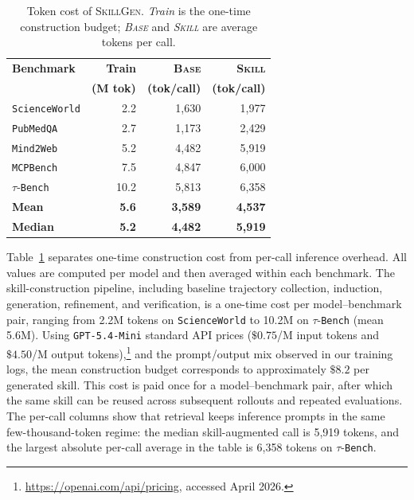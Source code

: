 \documentclass{article}
\begin{document}
\begin{table}[h]
\centering
\caption{Token cost of \textsc{SkillGen}. \emph{Train} is the one-time construction budget; \emph{\textsc{Base}} and \emph{\textsc{Skill}} are average tokens per call.}
\label{tab:token-analysis}
\vspace{3pt}
\begingroup
\footnotesize
{}
\setlength{\tabcolsep}{3.8pt}
\renewcommand{\arraystretch}{1.04}
\begin{tabular}{@{}lrrr@{}}
\toprule
\rowcolor{sgTokHeader}
\textbf{Benchmark} & \textbf{Train} & \textbf{\textsc{Base}} & \textbf{\textsc{Skill}} \\
\rowcolor{sgTokHeader}
                   & \textbf{(M tok)} & \textbf{(tok/call)} & \textbf{(tok/call)} \\
\midrule
\rowcolor{sgTokStripe}
\texttt{ScienceWorld} & 2.2  & 1{,}630 & 1{,}977 \\
\texttt{PubMedQA}     & 2.7  & 1{,}173 & 2{,}429 \\
\rowcolor{sgTokStripe}
\texttt{Mind2Web}     & 5.2  & 4{,}482 & 5{,}919 \\
\texttt{MCPBench}     & 7.5  & 4{,}847 & 6{,}000 \\
\rowcolor{sgTokStripe}
$\tau$-\texttt{Bench} & 10.2 & 5{,}813 & 6{,}358 \\
\midrule
\rowcolor{sgTokAvg}
\textbf{Mean}   & \textbf{5.6} & \textbf{3{,}589} & \textbf{4{,}537} \\
\rowcolor{sgTokAvg}
\textbf{Median} & \textbf{5.2} & \textbf{4{,}482} & \textbf{5{,}919} \\
\bottomrule
\end{tabular}
\endgroup
\vspace{-5pt}
\end{table}

Table~\ref{tab:token-analysis} separates one-time construction cost from per-call inference overhead. All values are computed per model and then averaged within each benchmark. The skill-construction pipeline, including baseline trajectory collection, induction, generation, refinement, and verification, is a one-time cost per model--benchmark pair, ranging from 2.2M tokens on \texttt{ScienceWorld} to 10.2M on $\tau$-\texttt{Bench} (mean 5.6M). Using \texttt{GPT-5.4-Mini} standard API prices (\(\$0.75\)/M input tokens and \(\$4.50\)/M output tokens),\footnote{\url{https://openai.com/api/pricing}, accessed April 2026.} and the prompt/output mix observed in our training logs, the mean construction budget corresponds to approximately \(\$8.2\) per generated skill. This cost is paid once for a model--benchmark pair, after which the same skill can be reused across subsequent rollouts and repeated evaluations. The per-call columns show that retrieval keeps inference prompts in the same few-thousand-token regime: the median skill-augmented call is 5{,}919 tokens, and the largest absolute per-call average in the table is 6{,}358 tokens on $\tau$-\texttt{Bench}.
\end{document}

